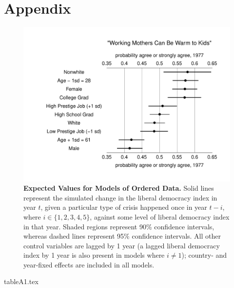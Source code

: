 \documentclass[12pt]{article}
\theoremstyle{hypotheses}
\begin{document}
\clearpage





\clearpage



\appendix
\section*{Appendix}
\setcounter{secnumdepth}{0}
\setcounter{table}{0}
\setcounter{figure}{0}
\renewcommand{\thetable}{A\arabic{table}}
\renewcommand{\thefigure}{A\arabic{figure}}

\begin{figure}[tbh]
  \begin{center}
      \includegraphics[width=1.05\textwidth]{plots/mothers1catEV.pdf}
      \vspace{-2.5em}
      \caption{\textbf{Expected Values for Models of Ordered Data.} Solid lines represent the simulated change in the liberal democracy index in year $t$, given a particular type of crisis happened once in year $t-i$, where $i \in \{1, 2, 3, 4, 5\}$, against some level of liberal democracy index in that year. Shaded regions represent 90\% confidence intervals, whereas dashed lines represent 95\% confidence intervals. All other control variables are lagged by 1 year (a lagged liberal democracy index by 1 year is also present in models where $i \neq 1$); country- and year-fixed effects are included in all models.}
      \label{fig:crises*libdem*time}
  \end{center}
\end{figure} 


\begin{landscape}
{tableA1.tex}
\end{landscape}
\end{document}
